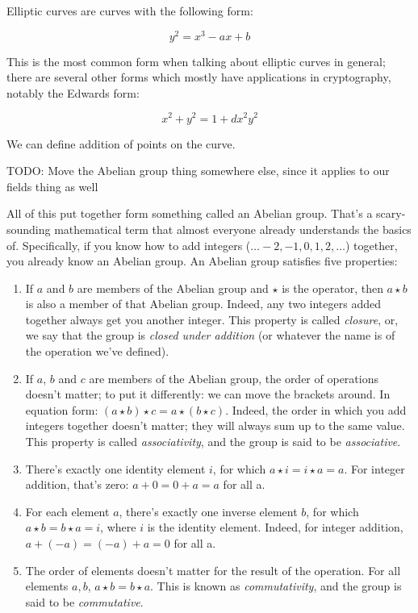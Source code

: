 \documentclass[11pt,ebook,table,dvipsnames]{memoir}
\begin{document}
Elliptic curves are curves with the following form:

\[
y^2 = x^3 - ax + b
\]

This is the most common form when talking about elliptic curves in
general; there are several other forms which mostly have applications
in cryptography, notably the Edwards form:

\[
x^2 + y^2 = 1 + dx^2y^2
\]

We can define addition of points on the curve.

TODO: Move the Abelian group thing somewhere else, since it applies to
our fields thing as well

All of this put together form something called an Abelian group.
That's a scary-sounding mathematical term that almost everyone already
understands the basics of. Specifically, if you know how to add
integers ($\ldots -2, -1, 0, 1, 2, \ldots$) together, you already know
an Abelian group. An Abelian group satisfies five properties:

\begin{enumerate}
\item If $a$ and $b$ are members of the Abelian group and $\star$ is the
operator, then $a \star b$ is also a member of that Abelian group.
Indeed, any two integers added together always get you another
integer. This property is called \emph{closure}, or, we say that the
group is \emph{closed under addition} (or whatever the name is of the
operation we've defined).
\item If $a$, $b$ and $c$ are members of the Abelian group, the order of
operations doesn't matter; to put it differently: we can move the
brackets around. In equation form: $(a \star b) \star c = a \star
   (b \star c)$. Indeed, the order in which you add integers together
doesn't matter; they will always sum up to the same value. This
property is called \emph{associativity}, and the group is said to be
\emph{associative}.
\item There's exactly one identity element $i$, for which $a \star i = i
   \star a = a$. For integer addition, that's zero: $a + 0 = 0 + a =
   a$ for all a.
\item For each element $a$, there's exactly one inverse element $b$, for
which $a \star b = b \star a = i$, where $i$ is the identity
element. Indeed, for integer addition, $a + (-a) = (-a) + a = 0$
for all a.
\item The order of elements doesn't matter for the result of the
operation. For all elements $a, b$, $a \star b = b \star a$. This
is known as \emph{commutativity}, and the group is said to be
\emph{commutative}.
\end{enumerate}
\end{document}
